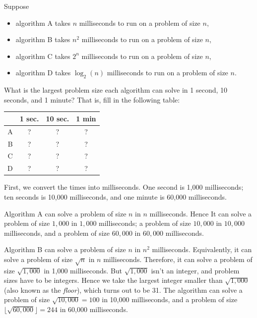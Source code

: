 \begin{prob}
    Suppose
    \begin{itemize}
        \item algorithm A takes $n$ milliseconds to run on a problem of size $n$,
        \item algorithm B takes $n^2$ milliseconds to run on a problem of size $n$,
        \item algorithm C takes $2^n$ milliseconds to run on a problem of size $n$,
        \item algorithm D takes $\log_2(n)$ milliseconds to run on a problem of size $n$.
    \end{itemize}
    What is the largest problem size each algorithm can solve in 1 second,
    10 seconds, and 1 minute? That is, fill in the following table:

    \begin{center}
        \begin{tabular}{rccc}
            \toprule
              & 1 sec. & 10 sec. & 1 min \\ \midrule
            A & ?      & ?       & ?     \\
            B & ?      & ?       & ?     \\
            C & ?      & ?       & ?     \\
            D & ?      & ?       & ?     \\ \bottomrule
        \end{tabular}
    \end{center}


    \begin{soln}
        First, we convert the times into milliseconds. One second is 1,000 milliseconds;
        ten seconds is 10,000 milliseconds, and one minute is 60,000 milliseconds.

        Algorithm A can solve a problem of size $n$ in $n$ milliseconds. Hence
        It can solve a problem of size $1,000$ in $1,000$ milliseconds;
        a problem of size $10,000$ in $10,000$ milliseconds, and a problem
        of size $60,000$ in $60,000$ milliseconds.

        Algorithm B can solve a problem of size $n$ in $n^2$ milliseconds. Equivalently, it can solve a problem of size $\sqrt{n}$ in $n$ milliseconds. Therefore, it can solve a problem of size $\sqrt{1,000}$ in 1,000 milliseconds. But $\sqrt{1,000}$ isn't an integer, and problem sizes have to be integers. Hence we take the largest integer
        smaller than $\sqrt{1,000}$ (also known as the \emph{floor}), which
        turns out to be 31. The algorithm can solve a problem of size
        $\sqrt{10,000} = 100$ in 10,000 milliseconds, and a problem of size
        $\lfloor \sqrt{60,000} \rfloor = 244$ in 60,000 milliseconds.


\end{soln}
\end{prob}
